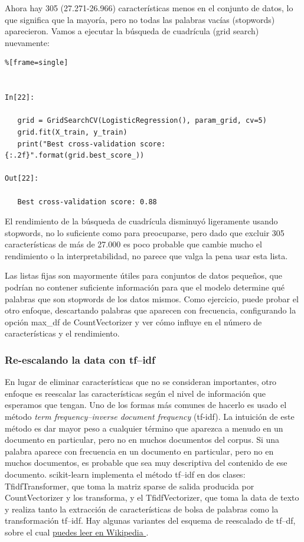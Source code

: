 Ahora hay 305 (27.271-26.966) características menos en el conjunto de datos, lo que significa que la mayoría, pero no todas las palabras vacías (stopwords)  aparecieron. Vamos a ejecutar la búsqueda de cuadrícula 
(grid search)  nuevamente:  %

\begin{lstlisting}%[frame=single]


In[22]:

   grid = GridSearchCV(LogisticRegression(), param_grid, cv=5)
   grid.fit(X_train, y_train)
   print("Best cross-validation score: {:.2f}".format(grid.best_score_))

Out[22]:

   Best cross-validation score: 0.88
\end{lstlisting}


El rendimiento de la búsqueda de cuadrícula disminuyó ligeramente usando  stopwords, no lo suficiente como para preocuparse, pero dado que excluir 305 características de más de 27.000 es poco probable que cambie mucho el rendimiento o la interpretabilidad, no parece que valga la pena usar esta lista. 

Las listas fijas son mayormente útiles para conjuntos de datos pequeños, que podrían no contener suficiente información para que el modelo determine qué palabras que son stopwords de los datos mismos. 
Como ejercicio, puede probar el otro enfoque, descartando palabras que aparecen con frecuencia, configurando la opción  {\ttfamily  max\_df}  de {\ttfamily CountVectorizer} y ver cómo influye en el número de características y el rendimiento.



\subsubsection{Re-escalando la data con {\ttfamily \bf{tf–idf}}}


En lugar de eliminar características que no se consideran importantes, otro enfoque es
reescalar las características según el nivel de información que esperamos que tengan.
Uno de los  formas más comunes de hacerlo es usado  el  método \emph{term frequency–inverse document frequency}  (tf-idf). 
La intuición de este método es dar mayor peso a cualquier término que aparezca
a menudo en un documento en particular, pero no en muchos documentos  del  corpus.
 Si una palabra aparece con frecuencia  en un documento en particular, pero no en muchos documentos, es probable que sea  muy descriptiva del contenido de ese documento. 
 {\ttfamily scikit-learn} implementa el método {\ttfamily tf–idf}  en dos clases:
  {\ttfamily TfidfTransformer}, que toma la matriz sparse de salida producida por 
   {\ttfamily CountVectorizer}  y los  transforma, y el {\ttfamily TfidfVectorizer}, 
 que toma la data  de texto y realiza tanto la extracción de características
 de bolsa de palabras como la   transformación {\ttfamily  tf–idf.}
  Hay algunas variantes  del esquema de reescalado  de  tf–df, sobre el cual  \href{https://en.wikipedia.org/wiki/Tf-idf}{\textcolor{vino}{puedes leer en Wikipedia} }.   

